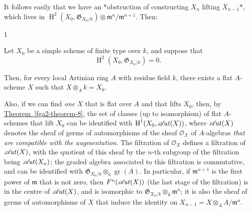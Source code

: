   It follows easily that we have an *obstruction of constructing \(X_n\) lifting \(X_{n-1}\)*, which lives in \(\operatorname {H}^2(X_0,\mathfrak {G}_{X_0/k})\otimes \mathfrak {m}^n/\mathfrak {m}^{n+1}\).
  Then:\begin{corollary}{1}\label{fga2-theorem-8-corollary-1}\skipsinglepar\par{}Let \(X_0\) be a simple scheme of finite type over \(k\), and suppose that
    \[       \operatorname {H}^2(X_0,\mathfrak {G}_{X_0/k})       = 0.     \]
    
    Then, for every local Artinian ring \(A\) with residue field \(k\), there exists a flat \(A\)-scheme \(X\) such that \(X\otimes _A k=X_0\).\end{corollary}\par{}Also, if we can find \emph{one} \(X\) that is flat over \(A\) and that lifts \(X_0\), then, by \hyperref[fga2-theorem-8]{Theorem~\ref*{fga2-theorem-8}}, the set of classes (up to isomorphism) of flat \(A\)-schemes that lift \(X_0\) can be identified with \(\operatorname {H}^1(X_0,\mathscr {A}\kern  -1.75pt\mathit {ut}(X))\), where \(\mathscr {A}\kern  -1.75pt\mathit {ut}(X)\) denotes the sheaf of germs of automorphisms of the sheaf \(\mathscr {O_X}\) of \(A\)-algebras \emph{that are compatible with the augmentation}.
  The filtration of \(\mathcal {O}_X\) defines a filtration of \(\mathscr {A}\kern  -1.75pt\mathit {ut}(X)\), with the quotient of this sheaf by the \(n\)-th subgroup of the filtration being \(\mathscr {A}\kern  -1.75pt\mathit {ut}(X_n)\);
  the graded algebra associated to this filtration is commutative, and can be identified with \(\mathfrak {G}_{X_0/k}\otimes _k\operatorname {gr}(A)\).
  In particular, if \(\mathfrak {m}^{n+1}\) is the first power of \(\mathfrak {m}\) that is not zero, then \(F^n(\mathscr {A}\kern  -1.75pt\mathit {ut}(X))\) (the last stage of the filtration) is in the centre of \(\mathscr {A}\kern  -1.75pt\mathit {ut}(X)\), and is isomorphic to \(\mathfrak {G}_{X_0/k}\otimes _k\mathfrak {m}^n\);
  it is also the sheaf of germs of automorphisms of \(X\) that induce the identity on \(X_{n-1}=X\otimes _A A/\mathfrak {m}^n\).
